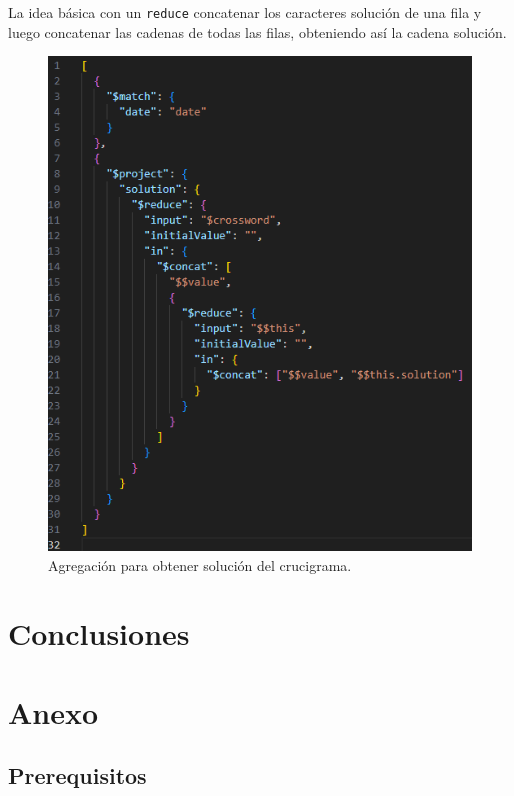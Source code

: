 \documentclass[12pt, a4paper]{article}
\begin{document}
La idea básica con un \verb*|reduce| concatenar los caracteres solución de una fila
y luego concatenar las cadenas de todas las filas, obteniendo así la cadena solución.

\begin{figure}[h!]
	\centering
	\includegraphics[width=\linewidth]{img/reduceQuery}
	\caption{Agregación para obtener solución del crucigrama.}
	\label{fig:reducequery}
\end{figure}

\section{Conclusiones}

\section{Anexo} \label{sec:Anexo}

\subsection{Prerequisitos}
\end{document}

